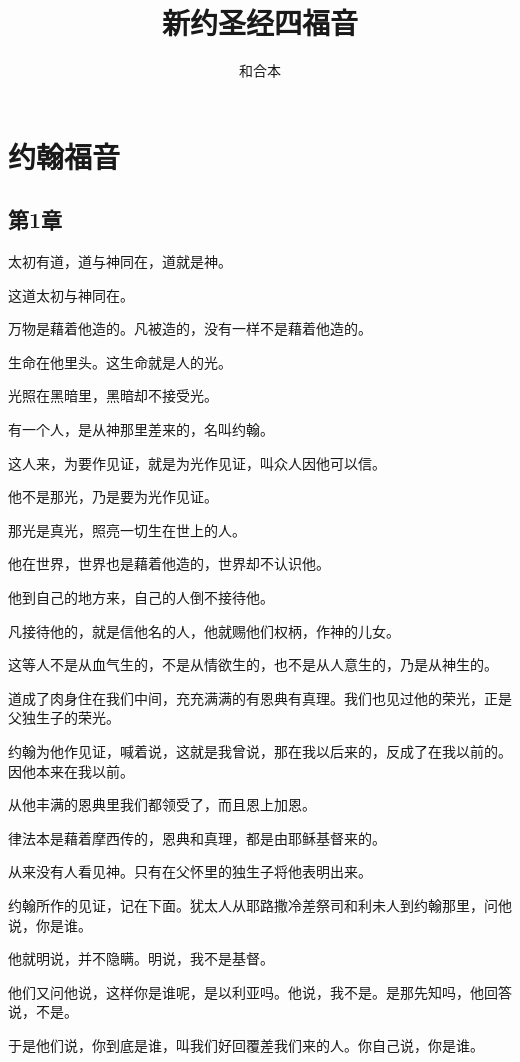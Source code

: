 \documentclass[12pt,oneside]{book}
\title{新约圣经四福音}
\author{和合本}
\begin{document}

\frontmatter


\setcounter{tocdepth}{2}    
\tableofcontents

\mainmatter


\part{约翰福音}
\chapter{第1章}
太初有道，道与神同在，道就是神。

这道太初与神同在。

万物是藉着他造的。凡被造的，没有一样不是藉着他造的。

生命在他里头。这生命就是人的光。

光照在黑暗里，黑暗却不接受光。

有一个人，是从神那里差来的，名叫约翰。

这人来，为要作见证，就是为光作见证，叫众人因他可以信。

他不是那光，乃是要为光作见证。

那光是真光，照亮一切生在世上的人。

他在世界，世界也是藉着他造的，世界却不认识他。

他到自己的地方来，自己的人倒不接待他。

凡接待他的，就是信他名的人，他就赐他们权柄，作神的儿女。

这等人不是从血气生的，不是从情欲生的，也不是从人意生的，乃是从神生的。

道成了肉身住在我们中间，充充满满的有恩典有真理。我们也见过他的荣光，正是父独生子的荣光。

约翰为他作见证，喊着说，这就是我曾说，那在我以后来的，反成了在我以前的。因他本来在我以前。

从他丰满的恩典里我们都领受了，而且恩上加恩。

律法本是藉着摩西传的，恩典和真理，都是由耶稣基督来的。

从来没有人看见神。只有在父怀里的独生子将他表明出来。

约翰所作的见证，记在下面。犹太人从耶路撒冷差祭司和利未人到约翰那里，问他说，你是谁。

他就明说，并不隐瞒。明说，我不是基督。

他们又问他说，这样你是谁呢，是以利亚吗。他说，我不是。是那先知吗，他回答说，不是。

于是他们说，你到底是谁，叫我们好回覆差我们来的人。你自己说，你是谁。
\end{document}
